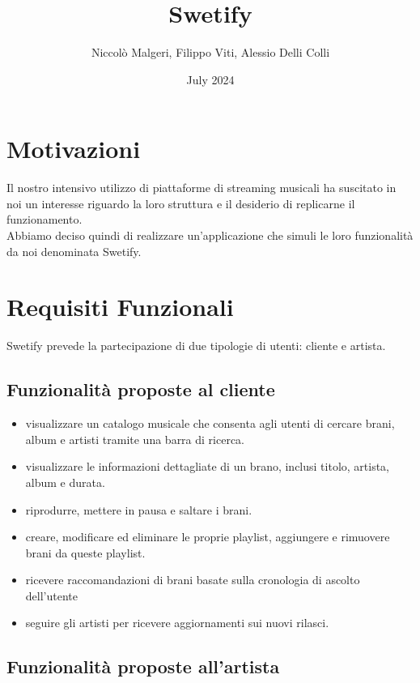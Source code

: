 \documentclass{article}
\title{Swetify}
\author{Niccolò Malgeri, Filippo Viti, Alessio Delli Colli}
\date{July 2024}
\begin{document}
\maketitle

\tableofcontents
\newpage


\section{Motivazioni}
Il nostro intensivo utilizzo di piattaforme di streaming musicali ha suscitato in noi un interesse riguardo
la loro struttura e il desiderio di replicarne il funzionamento.\\
Abbiamo deciso quindi di realizzare un'applicazione che simuli le loro funzionalità da noi denominata Swetify.
\section{Requisiti Funzionali}
Swetify prevede la partecipazione di due tipologie di utenti: cliente e artista.

\subsection{Funzionalità proposte al cliente}

\begin{itemize}
\item
  visualizzare un catalogo musicale che consenta agli utenti di cercare brani, album e artisti tramite una barra
  di ricerca.
  
\item
  visualizzare le informazioni dettagliate di un brano, inclusi titolo, artista, album e durata.
  
\item
  riprodurre, mettere in pausa e saltare i brani.

\item
  creare, modificare ed eliminare le proprie playlist, aggiungere e rimuovere brani da queste playlist.

\item
  ricevere raccomandazioni di brani basate sulla cronologia di ascolto dell'utente

\item
  seguire gli artisti per ricevere aggiornamenti sui nuovi rilasci.
  
\end{itemize}

\subsection{Funzionalità proposte all'artista}
\end{document}

